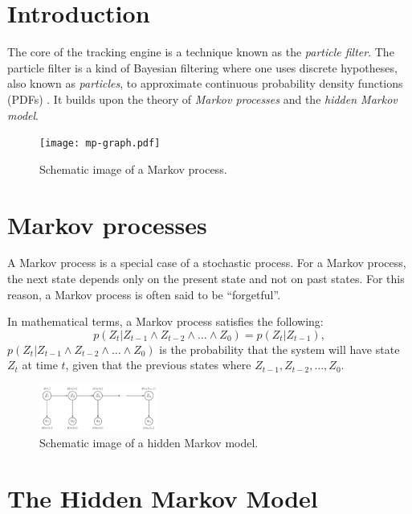 \section{Introduction} The core of the tracking engine is a technique
known as the \emph{particle filter}.  The particle filter is a kind of
Bayesian filtering where one uses discrete hypotheses, also known as
\emph{particles}, to approximate continuous probability density
functions (PDFs) \cite{ProbRob}.  It builds upon the theory of
\emph{Markov processes} and the \emph{hidden Markov model}.


\begin{figure} \centering
  \texttt{[image: mp-graph.pdf]}
  \caption{Schematic image of a Markov process.}
  \label{fig:hmm-graph}
\end{figure}


\section{Markov processes} A Markov process is a special case of a
stochastic process. For a Markov process, the next state depends only
on the present state and not on past states.  For this reason, a
Markov process is often said to be ``forgetful''.

In mathematical terms, a Markov process satisfies the following:
\begin{equation} p\left(Z_t|Z_{t-1} \wedge Z_{t-2} \wedge \dots \wedge
Z_0\right) = p\left(Z_t|Z_{t-1}\right),
\end{equation} $p\left(Z_t|Z_{t-1} \wedge Z_{t-2} \wedge \dots \wedge
Z_0\right)$ is the probability that the system will have state $Z_t$
at time $t$, given that the previous states where $Z_{t-1},
Z_{t-2},\dots, Z_0$.

\begin{figure} \centering
  \includegraphics[width=0.35\textwidth]{hmm-graph.pdf}
  \caption{Schematic image of a hidden Markov model.}
  \label{fig:hmm-graph}
\end{figure}

\section{The Hidden Markov Model}


